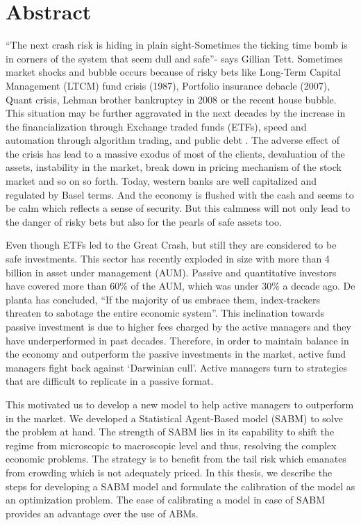 
\newpage
\vspace{3cm}

\chapter*{Abstract}

``The next crash risk is hiding in plain sight-Sometimes the ticking time bomb is in corners of the system that seem dull and safe''- says Gillian Tett. Sometimes market shocks and bubble occurs because of risky bets like Long-Term Capital Management (LTCM) fund crisis (1987), Portfolio insurance debacle (2007), Quant crisis, Lehman brother bankruptcy in 2008 or the recent house bubble. This situation may be further aggravated in the next decades by the increase in the financialization through Exchange traded funds (ETFs), speed and automation through algorithm trading, and public debt \cite{a5}. The adverse effect of the crisis has lead to a massive exodus of most of the clients, devaluation of the assets, instability in the market, break down in pricing mechanism of the stock market and so on so forth. Today, western banks are well capitalized and regulated by Basel terms. And the economy is flushed with the cash and seems to be calm which reflects a sense of security. But this calmness will not only lead to the danger of risky bets but also for the pearls of safe assets too. 

Even though ETFs led to the Great Crash, but still they are considered to be safe investments. This sector has recently exploded in size with more than 4 billion in asset under management (AUM). Passive and quantitative investors have covered more than 60\% of the AUM, which was under 30\% a decade ago. De planta \cite{a3} has concluded, ``If the majority of us embrace them, index-trackers threaten to sabotage the entire economic system''. This inclination towards passive investment is due to higher fees charged by the active managers and they have underperformed in past decades. Therefore, in order to maintain balance in the economy and outperform the passive investments in the market, active fund managers fight back against ‘Darwinian cull’. Active managers turn to strategies that are difficult to replicate in a passive format. 

This motivated us to develop a new model to help active managers to outperform in the market. We developed a Statistical Agent-Based model (SABM) to solve the problem at hand. The strength of SABM lies in its capability to shift the regime from microscopic to macroscopic level and thus, resolving the complex economic problems. The strategy is to benefit from the tail risk which emanates from crowding which is not adequately priced. In this thesis, we describe the steps for developing a SABM model and formulate the calibration of the model as an optimization problem. The ease of calibrating a model in case of SABM provides an advantage over the use of ABMs. 

